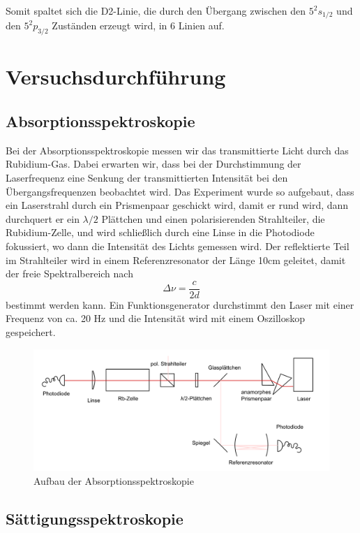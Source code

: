 \documentclass[a4paper,parskip]{scrartcl}
\begin{document}
Somit spaltet sich die D2-Linie, die durch den Übergang zwischen den $5^2s_{1/2}$ und den $5^2p_{3/2}$ Zuständen erzeugt wird, in 6 Linien auf.

\section{Versuchsdurchführung}

\subsection{Absorptionsspektroskopie}

 Bei der Absorptionsspektroskopie messen wir das transmittierte Licht durch das Rubidium-Gas. Dabei erwarten wir, dass bei der Durchstimmung der Laserfrequenz eine Senkung der transmittierten Intensität bei den Übergangsfrequenzen beobachtet wird. Das Experiment wurde so aufgebaut, dass ein Laserstrahl durch ein Prismenpaar geschickt wird, damit er rund wird, dann durchquert er ein $\lambda /2$ Plättchen und einen polarisierenden Strahlteiler, die Rubidium-Zelle, und wird schließlich durch eine Linse in die Photodiode fokussiert, wo dann die Intensität des Lichts gemessen wird. Der reflektierte Teil im Strahlteiler wird in einem Referenzresonator der Länge 10cm geleitet, damit der freie Spektralbereich nach 
\begin{equation*}
	\Delta \nu = \frac{c}{2d}
\end{equation*}
bestimmt werden kann.
Ein Funktionsgenerator durchstimmt den Laser mit einer Frequenz von ca. 20 Hz und die Intensität wird mit einem Oszilloskop gespeichert.

\begin{figure}[h]
\centering
\includegraphics[width=\textwidth]{Aufbau_1.png}
\caption{Aufbau der Absorptionsspektroskopie}
\end{figure}

\subsection{Sättigungsspektroskopie}
\end{document}

